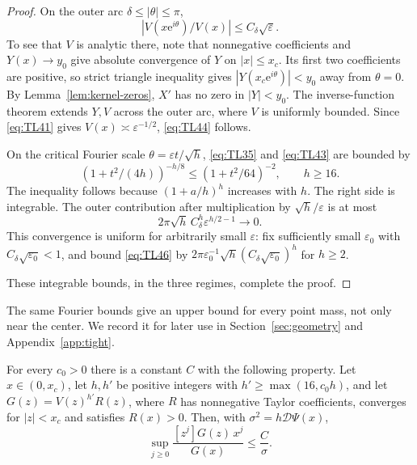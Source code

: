 \begin{proof}
On the outer arc \(\delta\le|\theta|\le\pi\), \begin{equation}
|V(x\mathrm{e}^{i\theta})/V(x)|\le C_\delta\sqrt\varepsilon.
 \label{eq:TL44}
\end{equation} To see that \(V\) is analytic there, note that nonnegative coefficients and
\(Y(x)\to y_0\) give absolute convergence of \(Y\) on \(|x|\le x_c\).
Its first two coefficients are positive, so strict triangle inequality
gives \(|Y(x_c \mathrm{e}^{i\theta})|<y_0\) away from \(\theta=0\). By Lemma~\ref{lem:kernel-zeros}, \(X'\) has no zero in \(|Y|<y_0\). The inverse-function theorem
extends \(Y,V\) across the outer arc, where \(V\) is uniformly bounded.
Since \eqref{eq:TL41} gives \(V(x)\asymp\varepsilon^{-1/2}\), \eqref{eq:TL44} follows.

On the critical Fourier scale \(\theta=\varepsilon t/\sqrt h\), \eqref{eq:TL35}
and \eqref{eq:TL43} are bounded by \begin{equation}
(1+t^2/(4h))^{-h/8}\le(1+t^2/64)^{-2},\qquad h\ge16.
 \label{eq:TL45}
\end{equation} The inequality follows because \((1+a/h)^h\) increases with \(h\).
The right side is integrable. The outer contribution after
multiplication by \(\sqrt h/\varepsilon\) is at most \begin{equation}
2\pi\sqrt h\,C_\delta^h\varepsilon^{h/2-1}\longrightarrow0.
 \label{eq:TL46}
\end{equation} This convergence is uniform for arbitrarily small \(\varepsilon\):
fix sufficiently small \(\varepsilon_0\) with
\(C_\delta\sqrt{\varepsilon_0}<1\), and bound \eqref{eq:TL46} by
\(2\pi\varepsilon_0^{-1}\sqrt h(C_\delta\sqrt{\varepsilon_0})^h\) for
\(h\ge2\).

These integrable bounds, in the three regimes, complete the proof.
\end{proof}

The same Fourier bounds give an upper bound for every point mass, not
only near the center. We record it for later use in
Section~\ref{sec:geometry} and Appendix~\ref{app:tight}.

\begin{lemma}\label{lem:point-mass}
For every $c_0>0$ there is a constant $C$ with the following property.
Let $x\in(0,x_c)$, let $h,h'$ be positive integers with $h'\ge\max(16,c_0h)$,
and let $G(z)=V(z)^{h'}R(z)$, where $R$ has nonnegative Taylor
coefficients, converges for $|z|<x_c$ and satisfies $R(x)>0$. Then,
with $\sigma^2=h\mathscr D\Psi(x)$,
\[
 \sup_{j\ge0}\frac{[z^j]G(z)\,x^j}{G(x)}\le\frac C\sigma.
\]
\end{lemma}

